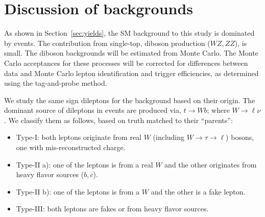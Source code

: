 \section{Discussion of backgrounds}
\label{sec:bkgtypes}

As shown in Section~\ref{sec:yields}, the SM background to this study is dominated 
by \ttbar events. The contribution from single-top, diboson production ($WZ, ZZ$), 
is small. The diboson backgrounds will be estimated from Monte Carlo. 
The Monte Carlo acceptances for these processes will be corrected for differences between 
data and Monte Carlo lepton identification and trigger efficiencies, as determined using 
the tag-and-probe method.

We study the same sign dileptons for the \ttbar background based on their origin.
The dominant source of dileptons in \ttbar events are produced via, $t \rightarrow W b$; where 
$W \rightarrow \ell \nu $. We classify them as follows, based on truth matched to their ``parents'':

\begin{itemize}
\item Type-I: both leptons originate from real $W$ (including $W \rightarrow \tau \rightarrow \ell$) bosons, one with mis-reconstructed charge.
\item Type-II a): one of the leptons is from a real $W$ and the other originates from heavy flavor sources ($b, c$).
\item Type-II b): one of the leptons is from a $W$ and the other is a fake lepton.
\item Type-III: both leptons are fakes or from heavy flavor sources.
\end{itemize} 

